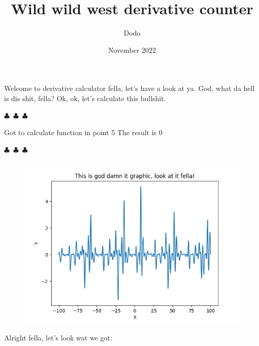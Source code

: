 \documentclass{article}
\title{Wild wild west derivative counter}
\author{Dodo}
\date{November 2022}
\begin{document}
    \maketitle
    
        Welcome to derivative calculator fella, let's have a look at ya. God, what da hell is dis shit, fella?
        Ok, ok, let's calculate this bullshit.

        \begin{center}
        $\clubsuit$~$\clubsuit$~$\clubsuit$
        \end{center}
    Got to calculate function in point 5
The result is 0\begin{center} $\clubsuit$~$\clubsuit$~$\clubsuit$ \end{center}\begin{figure}[H] \includegraphics[scale=0.6]{function_graph.png} \end{figure}Alright fella, let's look wat we got:
\end{document}
